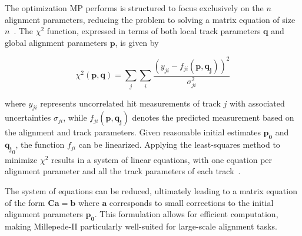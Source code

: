 The optimization MP performs is structured to focus exclusively on the $n$ alignment parameters, reducing the problem to solving a matrix equation of size $n$~\cite{WAdam_2009}. The $\chi^2$ function, expressed in terms of both local track parameters $\mathbf{q}$ and global alignment parameters $\mathbf{p}$, is given by  

\begin{equation}
\chi^2(\mathbf{p},\mathbf{q}) = \sum_{j} \sum_{i} \frac{\left(y_{ji} - f_{ji}(\mathbf{p}, \mathbf{q_j})\right)^2}{\sigma^2_{ji}}
\end{equation}

where $y_{ji}$ represents uncorrelated hit measurements of track $j$ with associated uncertainties $\sigma_{ji}$, while $f_{ji}(\mathbf{p}, \mathbf{q_j})$ denotes the predicted measurement based on the alignment and track parameters. Given reasonable initial estimates $\mathbf{p_0}$ and $\mathbf{q_j}_0$, the function $f_{ji}$ can be linearized. Applying the least-squares method to minimize $\chi^2$ results in a system of linear equations, with one equation per alignment parameter and all the track parameters of each track~\cite{WAdam_2009}.

The system of equations can be reduced, ultimately leading to a matrix equation of the form $\mathbf{C} \mathbf{a} = \mathbf{b}$ where $\mathbf{a}$ corresponds to small corrections to the initial alignment parameters $\mathbf{p_0}$. This formulation allows for efficient computation, making Millepede-II particularly well-suited for large-scale alignment tasks.






